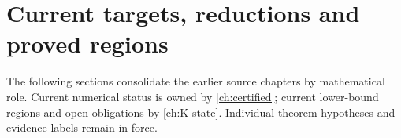 \chapter{Current targets, reductions and proved regions}\label{ch:05-targets-register}
\noindent The following sections consolidate the earlier source chapters by mathematical role. Current numerical status is owned by \autoref{ch:certified}; current lower-bound regions and open obligations by \autoref{ch:K-state}. Individual theorem hypotheses and evidence labels remain in force.




